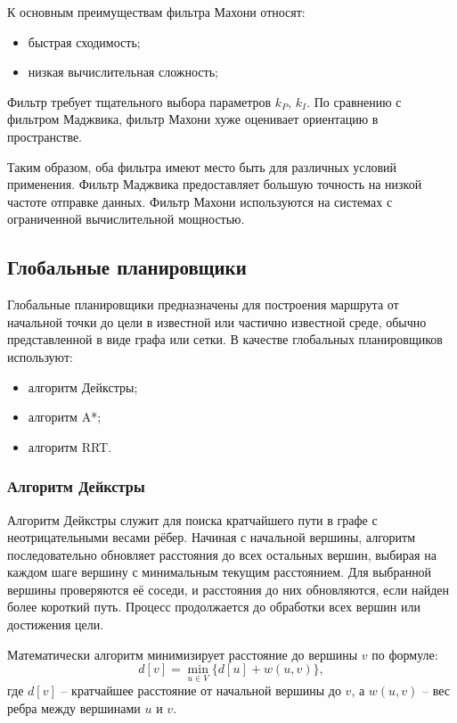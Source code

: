 К основным преимуществам фильтра Махони относят:
\begin{itemize}
	\item быстрая сходимость;
	\item низкая вычислительная сложность;
\end{itemize}

Фильтр требует тщательного выбора параметров \(k_P\), \(k_I\). По сравнению с фильтром Маджвика, 
фильтр Махони хуже оценивает ориентацию в пространстве.


Таким образом, оба фильтра имеют место быть для различных условий применения.
Фильтр Маджвика предоставляет большую точность на низкой частоте отправке данных.
Фильтр Махони используются на системах с ограниченной вычислительной мощностью.

\subsection{Глобальные планировщики}
Глобальные планировщики предназначены для построения маршрута от начальной точки до цели
в известной или частично известной среде, обычно представленной в виде графа или сетки.
В качестве глобальных планировщиков используют:
\begin{itemize}
	\item алгоритм Дейкстры;
	\item алгоритм A*;
	\item алгоритм RRT.
\end{itemize}

\subsubsection{Алгоритм Дейкстры}

Алгоритм Дейкстры служит для поиска кратчайшего пути в графе с неотрицательными весами рёбер.
Начиная с начальной вершины, алгоритм последовательно обновляет расстояния до всех остальных вершин,
выбирая на каждом шаге вершину с минимальным текущим расстоянием.
Для выбранной вершины проверяются её соседи, и расстояния до них обновляются,
если найден более короткий путь.
Процесс продолжается до обработки всех вершин или достижения цели.

Математически алгоритм минимизирует расстояние до вершины $v$ по формуле:
\begin{equation}
d[v] = \min_{u \in V} \{ d[u] + w(u, v) \},
\end{equation}
где $d[v]$ -- кратчайшее расстояние от начальной вершины до $v$,
а $w(u, v)$ -- вес ребра между вершинами $u$ и $v$.

